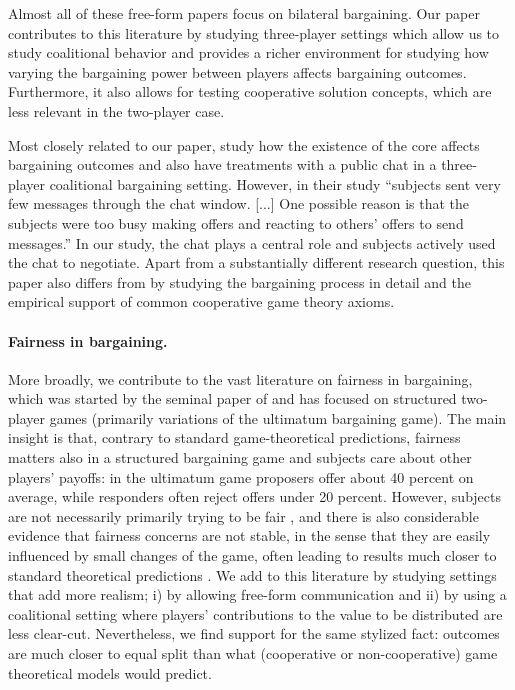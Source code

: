 \documentclass[12pt]{article}
\begin{document}
Almost all of these free-form papers focus on bilateral bargaining. Our paper contributes to this literature by studying three-player settings which allow us to study coalitional behavior and provides a richer environment for studying how varying the bargaining power between players affects bargaining outcomes. Furthermore, it also allows for testing cooperative solution concepts, which are less relevant in the two-player case.

Most closely related to our paper, \textcite{ShinodaFunaki2022} study how the existence of the core affects bargaining outcomes and also have treatments with a public chat in a three-player coalitional bargaining setting. However, in their study ``subjects sent very few messages through the chat window. [...] One possible reason is that the subjects were too busy making offers and reacting to others' offers to send messages.'' In our study, the chat plays a central role and subjects actively used the chat to negotiate. Apart from a substantially different research question, this paper also differs from \textcite{ShinodaFunaki2022} by studying the bargaining process in detail and the empirical support of common cooperative game theory axioms.


\paragraph{Fairness in bargaining.}

More broadly, we contribute to the vast literature on fairness in bargaining, which was started by the seminal paper of \textcite{Güthetal1982} and has focused on structured two-player games (primarily variations of the ultimatum bargaining game). The main insight is that, contrary to standard game-theoretical predictions, fairness matters also in a structured bargaining game and subjects care about other players' payoffs: in the ultimatum game proposers offer about 40 percent on average, while responders often reject offers under 20 percent. However, subjects are not necessarily primarily trying to be fair \parencite[]{Roth1995}, and there is also considerable evidence that fairness concerns are not stable, in the sense that they are easily influenced by small changes of the game, often leading to results much closer to standard theoretical predictions \parencite[e.g.]{Binmoreetal1985, GrimmMengel2011}. We add to this literature by studying settings that add more realism; i) by allowing free-form communication and ii) by using a coalitional setting where players' contributions to the value to be distributed are less clear-cut. Nevertheless, we find support for the same stylized fact: outcomes are much closer to equal split than what (cooperative or non-cooperative) game theoretical models would predict.
\end{document}
